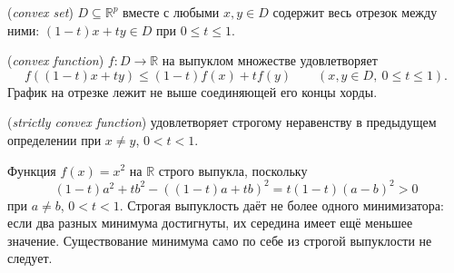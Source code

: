 \begin{definition} (\emph{convex set}) \(D\subseteq\mathbb R^p\) вместе с любыми \(x,y\in D\) содержит весь отрезок между ними: \((1-t)x+ty\in D\) при \(0\le t\le1\).\end{definition}
\begin{definition} (\emph{convex function}) \(f:D\to\mathbb R\) на выпуклом множестве удовлетворяет
\[f((1-t)x+ty)\le(1-t)f(x)+tf(y)\qquad(x,y\in D,\ 0\le t\le1).\]
График на отрезке лежит не выше соединяющей его концы хорды.\end{definition}
\begin{definition} (\emph{strictly convex function}) удовлетворяет строгому неравенству в предыдущем определении при \(x\ne y\), \(0<t<1\).\end{definition}
\begin{example}Функция \(f(x)=x^2\) на \(\mathbb R\) строго выпукла, поскольку
\[(1-t)a^2+tb^2-((1-t)a+tb)^2=t(1-t)(a-b)^2>0\]
при \(a\ne b\), \(0<t<1\). Строгая выпуклость даёт не более одного минимизатора: если два разных минимума достигнуты, их середина имеет ещё меньшее значение. Существование минимума само по себе из строгой выпуклости не следует.\end{example}
